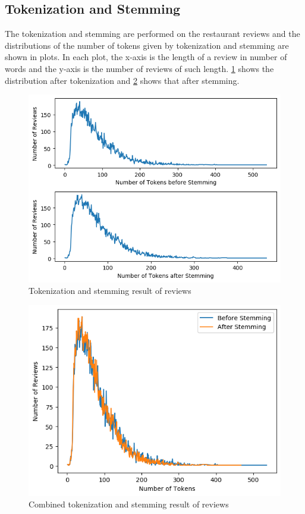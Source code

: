 \documentclass[sigconf]{acmart}
\begin{document}
\subsection{Tokenization and Stemming}
The tokenization and stemming are performed on the restaurant reviews and the distributions of the number of tokens given by tokenization and stemming are shown in plots. In each plot, the x-axis is the length of a review in number of words and the y-axis is the number of reviews of such length. \ref{fig:token_stem_separate} shows the distribution after tokenization and \ref{fig:token_stem_combined} shows that after stemming.

\begin{figure}[ht]
  \centering
  \includegraphics[width=\linewidth]{token_stem_separate.png}
  \caption{Tokenization and stemming result of reviews}
  \label{fig:token_stem_separate}
\end{figure}

\begin{figure}[ht]
  \centering
  \includegraphics[width=\linewidth]{token_stem_combined.png}
  \caption{Combined tokenization and stemming result of reviews}
  \label{fig:token_stem_combined}
\end{figure}
\end{document}
